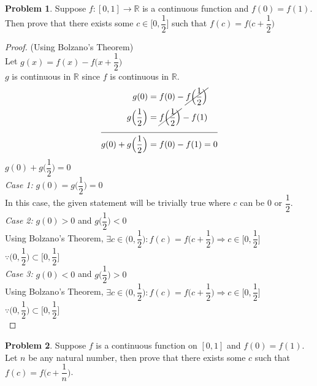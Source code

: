 \documentclass[14]{article}
\theoremstyle{definition}
\newtheorem{prob}{Problem}
\theoremstyle{case}
\begin{document}
\begin{prob}
Suppose $f:[0, 1] \to \mathbb{R}$ is a continuous function and $f(0) = f(1)$. Then prove that there exists some $c \in \Big[0, \dfrac{1}{2}\Big]$ such that $f(c) = f\Big(c + \dfrac{1}{2}\Big)$
\begin{proof} (Using Bolzano's Theorem)\\
Let $g(x) = f(x) - f\Big(x + \dfrac{1}{2}\Big)$\\
$g$ is continuous in $\mathbb{R}$ since $f$ is continuous in $\mathbb{R}$.\\
\begin{align}
g(0) &= f(0) - \cancel{f\Big(\dfrac{1}{2}\Big)}\\
g\Big(\dfrac{1}{2}\Big) &= \cancel{f\Big(\dfrac{1}{2}\Big)} - f(1)\\
\cline{1-2}
g(0)+g\Big(\dfrac{1}{2}\Big) &= f(0) - f(1) = 0
\end{align}
$g(0)+g\Big(\dfrac{1}{2}\Big) = 0$\\
\textit{Case 1:} $g(0)=g\Big(\dfrac{1}{2}\Big) = 0$\\
In this case, the given statement will be trivially true where $c$ can be $0$ or $\dfrac{1}{2}$.\\
\textit{Case 2:} $g(0) > 0$ and $g\Big(\dfrac{1}{2}\Big) < 0$\\
Using Bolzano's Theorem, $\exists c \in \Big(0, \dfrac{1}{2}\Big) : f(c) = f\Big(c + \dfrac{1}{2}\Big) \Rightarrow c \in \Big[0, \dfrac{1}{2}\Big]\;\;\;\;\;\;\;\;\;\;$ $\because \Big(0, \dfrac{1}{2}\Big) \subset \Big[0, \dfrac{1}{2}\Big] $\\
\textit{Case 3:} $g(0) < 0$ and $g\Big(\dfrac{1}{2}\Big) > 0$\\
Using Bolzano's Theorem, $\exists c \in \Big(0, \dfrac{1}{2}\Big) : f(c) = f\Big(c + \dfrac{1}{2}\Big) \Rightarrow c \in \Big[0, \dfrac{1}{2}\Big]\;\;\;\;\;\;\;\;\;\;$ $\because \Big(0, \dfrac{1}{2}\Big) \subset \Big[0, \dfrac{1}{2}\Big] $\\
\end{proof}
\end{prob}
\pagebreak
\begin{prob}
Suppose $f$ is a continuous function on $[0, 1]$ and $f(0) = f(1)$. Let $n$ be any natural number, then prove that there exists some $c$ such that $f(c) = f\Big(c + \dfrac{1}{n}\Big)$.
\end{prob}
\end{document}
